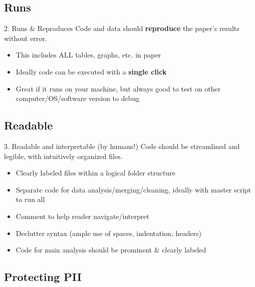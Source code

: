 \documentclass[12pt, compress]{beamer} %
\let\olditem\item %
\renewcommand{\item}{%
\olditem\vspace{\fill}}
\begin{document}
\subsection{Runs}
	\begin{frame}{2. Runs \& Reproduces}
		Code and data should \textbf{reproduce} the paper's results without error. 
		
		
		\begin{itemize}
			\item This includes ALL tables, graphs, etc. in paper
			\item Ideally code can be executed with a \textbf{single click}
			\item Great if it runs on your machine, but always good to test on other computer/OS/software version to debug
		\end{itemize}
		
			
	\end{frame}

\subsection{Readable}

	\begin{frame}{3. Readable and interpretable (by humans!)}
		Code should be streamlined and legible, with intuitively organized files. 
		
		
		\begin{itemize}		
			\item Clearly labeled files within a logical folder structure
			\item Separate code for data analysis/merging/cleaning, ideally with master script to run all
			\item Comment to help reader navigate/interpret
			\item Declutter syntax (ample use of spaces, indentation, headers)
			\item Code for main analysis should be prominent \& clearly labeled
		\end{itemize} 
			
	\end{frame}

\subsection{Protecting PII}
 
\end{document}
